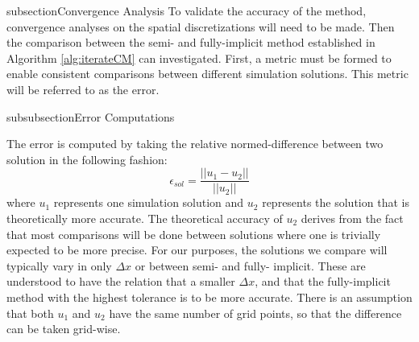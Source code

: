 
subsection{Convergence Analysis}
  To validate the accuracy of the method, convergence analyses on the spatial discretizations will need to be made. 
  Then the comparison between the semi- and fully-implicit method established in Algorithm \ref{alg:iterateCM} can investigated.
  First, a metric must be formed to enable consistent comparisons between different simulation solutions. 
  This metric will be referred to as the error. %

subsubsection{Error Computations}

  The error is computed by taking the relative normed-difference between two solution in the following fashion:
  \begin{equation} \label{equ:error_comp}
    \epsilon_{sol} = \frac{||u_1 - u_2||}{||u_2||}
  \end{equation}
  where $u_1$ represents one simulation solution and $u_2$ represents the solution that is theoretically more accurate.
  The theoretical accuracy of $u_2$ derives from the fact that most comparisons will be done between solutions where one is trivially expected to be more precise.
  For our purposes, the solutions we compare will typically vary in only $\Delta x$ or between semi- and fully- implicit.
  These are understood to have the relation that a smaller $\Delta x$, and that the fully-implicit method with the highest tolerance is to be more accurate.
  There is an assumption that both $u_1$ and $u_2$ have the same number of grid points, so that the difference can be taken grid-wise.

